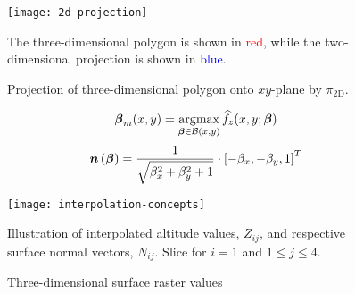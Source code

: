 %
\begin{figure}
  \centering
  \texttt{[image: 2d-projection]}
  \caption{%
    Projection of three-dimensional polygon onto $xy$-plane by $\pi_{\mathrm{2D}}$.
  }{%
    The three-dimensional polygon is shown in \textcolor{red}{red}, while the two-dimensional projection is shown in \textcolor{blue}{blue}.
  }%
  \label{fig:2d-polygon-projection}
\end{figure}
%
\begin{equation*}
  \boldsymbol{\beta}_m(x, y)
  =
  \operatorname*{\arg\!\max}_{\boldsymbol{\beta} \in \mathcal{B}(x, y)}
    \widehat{f}_z(x, y; \boldsymbol{\beta})
\end{equation*}
%
\begin{equation*}
  \vec{n}\left(\vec{\beta}\right)
  =
  \frac{%
    1
  }{%
    \sqrt{\beta_x^2 + \beta_y^2 + 1}
  }
  \cdot
  {\left[
    -\beta_{x}, -\beta_{y}, 1
  \right]}^T
\end{equation*}


\begin{figure}
  \centering
  \texttt{[image: interpolation-concepts]}
  \caption{Three-dimensional surface raster values}{%
    Illustration of interpolated altitude values, $Z_{ij}$, and respective surface normal vectors, $N_{ij}$.
    Slice for $i = 1$ and $1 \leq j \leq 4$.
  }
\end{figure}

